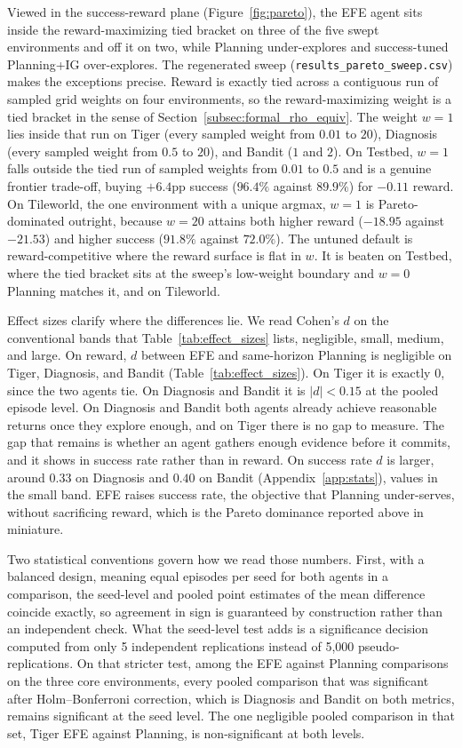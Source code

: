 Viewed in the success-reward plane (Figure~\ref{fig:pareto}), the EFE agent sits inside the reward-maximizing tied bracket on three of the five swept environments and off it on two, while Planning under-explores and success-tuned Planning+IG over-explores. The regenerated sweep (\texttt{results\_\allowbreak pareto\_\allowbreak sweep.csv}) makes the exceptions precise. Reward is exactly tied across a contiguous run of sampled grid weights on four environments, so the reward-maximizing weight is a tied bracket in the sense of Section~\ref{subsec:formal_rho_equiv}. The weight $w{=}1$ lies inside that run on Tiger (every sampled weight from $0.01$ to $20$), Diagnosis (every sampled weight from $0.5$ to $20$), and Bandit ($1$ and $2$). On Testbed, $w{=}1$ falls outside the tied run of sampled weights from $0.01$ to $0.5$ and is a genuine frontier trade-off, buying $+6.4$pp success ($96.4\%$ against $89.9\%$) for $-0.11$ reward. On Tileworld, the one environment with a unique argmax, $w{=}1$ is Pareto-dominated outright, because $w{=}20$ attains both higher reward ($-18.95$ against $-21.53$) and higher success ($91.8\%$ against $72.0\%$). The untuned default is reward-competitive where the reward surface is flat in $w$. It is beaten on Testbed, where the tied bracket sits at the sweep's low-weight boundary and $w{=}0$ Planning matches it, and on Tileworld.

Effect sizes clarify where the differences lie. We read Cohen's $d$ on the conventional bands that Table~\ref{tab:effect_sizes} lists, negligible, small, medium, and large. On reward, $d$ between EFE and same-horizon Planning is negligible on Tiger, Diagnosis, and Bandit (Table~\ref{tab:effect_sizes}). On Tiger it is exactly $0$, since the two agents tie. On Diagnosis and Bandit it is $|d| < 0.15$ at the pooled episode level. On Diagnosis and Bandit both agents already achieve reasonable returns once they explore enough, and on Tiger there is no gap to measure. The gap that remains is whether an agent gathers enough evidence before it commits, and it shows in success rate rather than in reward. On success rate $d$ is larger, around $0.33$ on Diagnosis and $0.40$ on Bandit (Appendix~\ref{app:stats}), values in the small band. EFE raises success rate, the objective that Planning under-serves, without sacrificing reward, which is the Pareto dominance reported above in miniature.

Two statistical conventions govern how we read those numbers. First, with a balanced design, meaning equal episodes per seed for both agents in a comparison, the seed-level and pooled point estimates of the mean difference coincide exactly, so agreement in sign is guaranteed by construction rather than an independent check. What the seed-level test adds is a significance decision computed from only 5 independent replications instead of 5,000 pseudo-replications. On that stricter test, among the EFE against Planning comparisons on the three core environments, every pooled comparison that was significant after Holm--Bonferroni correction, which is Diagnosis and Bandit on both metrics, remains significant at the seed level. The one negligible pooled comparison in that set, Tiger EFE against Planning, is non-significant at both levels.

